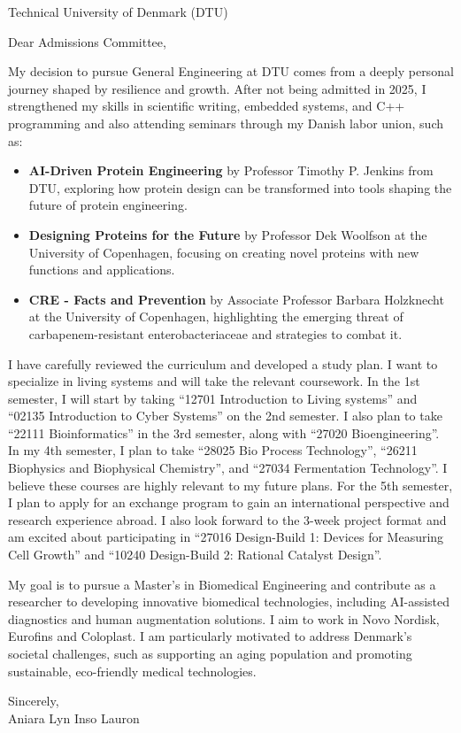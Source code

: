 \documentclass[12pt,a4paper]{letter}
\date{March 22, 2026}
\begin{document}
\begin{letter}{Technical University of Denmark (DTU)}

\opening{Dear Admissions Committee,}

My decision to pursue General Engineering at DTU comes from a deeply personal journey shaped by resilience and growth. After not being admitted in 2025, I strengthened my skills in scientific writing, embedded systems, and C++ programming and also attending seminars through my Danish labor union, such as:

\begin{itemize}
\item \textbf{AI-Driven Protein Engineering} by Professor Timothy P. Jenkins from DTU, exploring how protein design can be transformed into tools shaping the future of protein engineering.
\item \textbf{Designing Proteins for the Future} by Professor Dek Woolfson at the University of Copenhagen, focusing on creating novel proteins with new functions and applications.
\item \textbf{CRE - Facts and Prevention} by Associate Professor Barbara Holzknecht at the University of Copenhagen, highlighting the emerging threat of carbapenem-resistant enterobacteriaceae and strategies to combat it.
\end{itemize}

I have carefully reviewed the curriculum and developed a study plan. I want to specialize in living systems and will take the relevant coursework. In the 1st semester, I will start by taking \enquote{12701 Introduction to Living systems} and \enquote{02135 Introduction to Cyber Systems} on the 2nd semester. I also plan to take \enquote{22111 Bioinformatics} in the 3rd semester, along with \enquote{27020 Bioengineering}. In my 4th semester, I plan to take \enquote{28025 Bio Process Technology}, \enquote{26211 Biophysics and Biophysical Chemistry}, and \enquote{27034 Fermentation Technology}. I believe these courses are highly relevant to my future plans. For the 5th semester, I plan to apply for an exchange program to gain an international perspective and research experience abroad. I also look forward to the 3-week project format and am excited about participating in \enquote{27016 Design-Build 1: Devices for Measuring Cell Growth} and \enquote{10240 Design-Build 2: Rational Catalyst Design}.

My goal is to pursue a Master's in Biomedical Engineering and contribute as a researcher to developing innovative biomedical technologies, including AI-assisted diagnostics and human augmentation solutions. I aim to work in Novo Nordisk, Eurofins and Coloplast. I am particularly motivated to address Denmark's societal challenges, such as supporting an aging population and promoting sustainable, eco-friendly medical technologies.
\closing{Sincerely, \\
Aniara Lyn Inso Lauron}

\end{letter}
\end{document}
